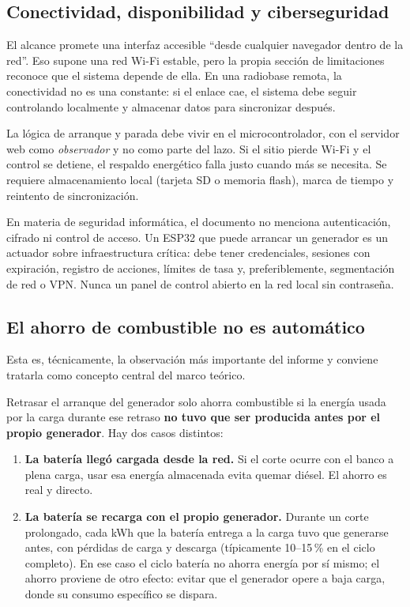 \documentclass[11pt,a4paper]{article}
\begin{document}
\subsection{Conectividad, disponibilidad y ciberseguridad}

El alcance promete una interfaz accesible ``desde cualquier navegador dentro de la red''. Eso supone una red Wi-Fi estable, pero la propia sección de limitaciones reconoce que el sistema depende de ella. En una radiobase remota, la conectividad no es una constante: si el enlace cae, el sistema debe seguir controlando localmente y almacenar datos para sincronizar después.

\begin{cajaReto}
La lógica de arranque y parada debe vivir en el microcontrolador, con el servidor web como \emph{observador} y no como parte del lazo. Si el sitio pierde Wi-Fi y el control se detiene, el respaldo energético falla justo cuando más se necesita. Se requiere almacenamiento local (tarjeta SD o memoria flash), marca de tiempo y reintento de sincronización.
\end{cajaReto}

En materia de seguridad informática, el documento no menciona autenticación, cifrado ni control de acceso. Un ESP32 que puede arrancar un generador es un actuador sobre infraestructura crítica: debe tener credenciales, sesiones con expiración, registro de acciones, límites de tasa y, preferiblemente, segmentación de red o VPN. Nunca un panel de control abierto en la red local sin contraseña.

\subsection{El ahorro de combustible no es automático}

Esta es, técnicamente, la observación más importante del informe y conviene tratarla como concepto central del marco teórico.

Retrasar el arranque del generador solo ahorra combustible si la energía usada por la carga durante ese retraso \textbf{no tuvo que ser producida antes por el propio generador}. Hay dos casos distintos:

\begin{enumerate}[leftmargin=1.4em, itemsep=3pt]
  \item \textbf{La batería llegó cargada desde la red.} Si el corte ocurre con el banco a plena carga, usar esa energía almacenada evita quemar diésel. El ahorro es real y directo.
  \item \textbf{La batería se recarga con el propio generador.} Durante un corte prolongado, cada kWh que la batería entrega a la carga tuvo que generarse antes, con pérdidas de carga y descarga (típicamente 10--15\,\% en el ciclo completo). En ese caso el ciclo batería no ahorra energía por sí mismo; el ahorro proviene de otro efecto: evitar que el generador opere a baja carga, donde su consumo específico se dispara.
\end{enumerate}
\end{document}
